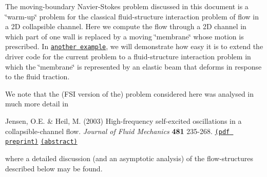 The moving-\/boundary Navier-\/\+Stokes problem discussed in this document is a \char`\"{}warm-\/up\char`\"{} problem for the classical fluid-\/structure interaction problem of flow in a 2D collapsible channel. Here we compute the flow through a 2D channel in which part of one wall is replaced by a moving \char`\"{}membrane\char`\"{} whose motion is prescribed. In \href{../../../interaction/fsi_collapsible_channel/html/index.html}{\tt another example}, we will demonstrate how easy it is to extend the driver code for the current problem to a fluid-\/structure interaction problem in which the \char`\"{}membrane\char`\"{} is represented by an elastic beam that deforms in response to the fluid traction.

We note that the (F\+SI version of the) problem considered here was analysed in much more detail in


\begin{DoxyItemize}
\item Jensen, O.\+E. \& Heil, M. (2003) High-\/frequency self-\/excited oscillations in a collapsible-\/channel flow. {\itshape Journal of Fluid Mechanics} {\bfseries 481} 235-\/268. \href{http://www.maths.man.ac.uk/~mheil/MATTHIAS/PDF/JensenHeil2003.pdf}{\tt (pdf preprint)} \href{http://www.maths.man.ac.uk/~mheil/MATTHIAS/ABSTRACTS/JensenHeil02.html}{\tt (abstract)} 
\end{DoxyItemize}where a detailed discussion (and an asymptotic analysis) of the flow-\/structures described below may be found.



 

